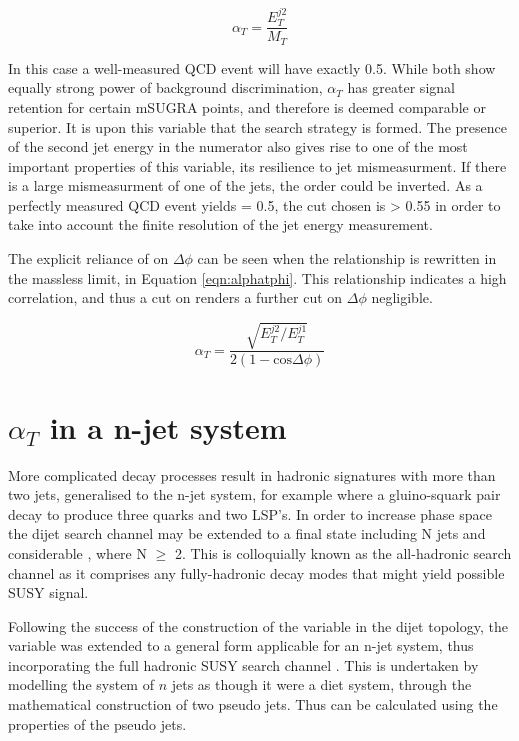\begin{equation}
\alpha_{T} = \frac{E_{T}^{j2}}{M_{T}} 
\label{eqn:alphat}
\end{equation}

In this case a well-measured QCD event will have exactly 0.5. While both show equally strong power of background discrimination, $\alpha_{T}$ has greater signal retention for certain mSUGRA points,\cite{PASaT} and therefore is deemed comparable or superior. It is upon this variable that the search strategy is formed. The presence of the second jet energy in the numerator also gives rise to one of the most important properties of this variable, its resilience to jet mismeasurment. If there is a large mismeasurment of one of the jets, the order could be inverted. As a perfectly measured QCD event yields \alt = 0.5, the cut chosen is \alt > 0.55 in order to take into account the finite resolution of the jet energy measurement.  


The explicit reliance of \alt on $\Delta \phi$ can be seen when the relationship is rewritten in the massless limit, in Equation \ref{eqn:alphatphi}. This relationship indicates a high correlation, and thus a cut on \alt renders a further cut on $\Delta \phi$ negligible\cite{ANaT}.

\begin{equation}
\alpha_{T} = \frac{\sqrt{E_{T}^{j2}/E_{T}^{j1}}}{2(1- \textrm{cos} \Delta \phi)} 
\label{eqn:alphatphi}
\end{equation}


\section{$\alpha_{T}$ in a n-jet system}
More complicated decay processes result in hadronic signatures with more than two jets, generalised to the n-jet system, for example where a gluino-squark pair decay to produce three quarks and two LSP's. In order to increase phase space the dijet search channel may be extended to a final state including N jets and considerable \met, where N $\geq$ 2. This is colloquially known as the all-hadronic search channel as it comprises any fully-hadronic decay modes that might yield possible SUSY signal. 

Following the success of the construction of the \alt variable in the dijet topology, the variable was extended to a general form applicable for an n-jet system, thus incorporating the full hadronic SUSY search channel\cite{ANnaT} . This is undertaken by modelling the system of $n$ jets as though it were a diet system, through the mathematical construction of two pseudo jets. Thus \alt can be calculated using the properties of the pseudo jets. 

